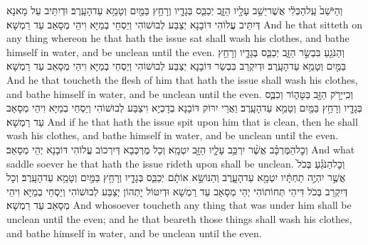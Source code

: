 {וְהַיֹּשֵׁב֙ עַֽל\maqqaf הַכְּלִ֔י אֲשֶׁר\maqqaf יֵשֵׁ֥ב עָלָ֖יו הַזָּ֑ב יְכַבֵּ֧ס בְּגָדָ֛יו וְרָחַ֥ץ בַּמַּ֖יִם וְטָמֵ֥א עַד\maqqaf הָעָֽרֶב׃}
{וּדְיִתֵּיב עַל מָאנָא דְּיִתֵּיב עֲלוֹהִי דּוֹבָנָא יְצַבַּע לְבוּשׁוֹהִי וְיַסְחֵי בְמַיָּא וִיהֵי מְסָאַב עַד רַמְשָׁא׃}
{And he that sitteth on any thing whereon he that hath the issue sat shall wash his clothes, and bathe himself in water, and be unclean until the even.}{}
{וְהַנֹּגֵ֖עַ בִּבְשַׂ֣ר הַזָּ֑ב יְכַבֵּ֧ס בְּגָדָ֛יו וְרָחַ֥ץ בַּמַּ֖יִם וְטָמֵ֥א עַד\maqqaf הָעָֽרֶב׃}
{וּדְיִקְרַב בִּבְשַׂר דּוֹבָנָא יְצַבַּע לְבוּשׁוֹהִי וְיַסְחֵי בְמַיָּא וִיהֵי מְסָאַב עַד רַמְשָׁא׃}
{And he that toucheth the flesh of him that hath the issue shall wash his clothes, and bathe himself in water, and be unclean until the even.}{}
{וְכִֽי\maqqaf יָרֹ֥ק הַזָּ֖ב בַּטָּה֑וֹר וְכִבֶּ֧ס בְּגָדָ֛יו וְרָחַ֥ץ בַּמַּ֖יִם וְטָמֵ֥א עַד\maqqaf הָעָֽרֶב׃}
{וַאֲרֵי יִרּוֹק דּוֹבָנָא בְדָכְיָא וִיצַבַּע לְבוּשׁוֹהִי וְיַסְחֵי בְמַיָּא וִיהֵי מְסָאַב עַד רַמְשָׁא׃}
{And if he that hath the issue spit upon him that is clean, then he shall wash his clothes, and bathe himself in water, and be unclean until the even.}{}
{וְכׇל\maqqaf הַמֶּרְכָּ֗ב אֲשֶׁ֨ר יִרְכַּ֥ב עָלָ֛יו הַזָּ֖ב יִטְמָֽא׃}
{וְכָל מֶרְכְּבָא דְּיִרְכוֹב עֲלוֹהִי דּוֹבָנָא יְהֵי מְסָאַב׃}
{And what saddle soever he that hath the issue rideth upon shall be unclean.}{}
{וְכׇל\maqqaf הַנֹּגֵ֗עַ בְּכֹל֙ אֲשֶׁ֣ר יִהְיֶ֣ה תַחְתָּ֔יו יִטְמָ֖א עַד\maqqaf הָעָ֑רֶב וְהַנּוֹשֵׂ֣א אוֹתָ֔ם יְכַבֵּ֧ס בְּגָדָ֛יו וְרָחַ֥ץ בַּמַּ֖יִם וְטָמֵ֥א עַד\maqqaf הָעָֽרֶב׃}
{וְכָל דְּיִקְרַב בְּכֹל דִּיהֵי תְּחוֹתוֹהִי יְהֵי מְסָאַב עַד רַמְשָׁא וּדְיִטּוֹל יָתְהוֹן יְצַבַּע לְבוּשׁוֹהִי וְיַסְחֵי בְמַיָּא וִיהֵי מְסָאַב עַד רַמְשָׁא׃}
{And whosoever toucheth any thing that was under him shall be unclean until the even; and he that beareth those things shall wash his clothes, and bathe himself in water, and be unclean until the even.}{}
